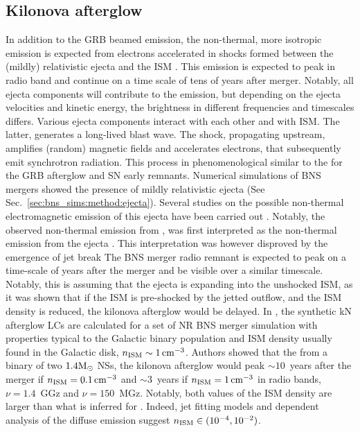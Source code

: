 \subsection{Kilonova afterglow}

In addition to the \ac{GRB} beamed emission, the non-thermal, more isotropic 
emission is expected from electrons accelerated in shocks formed between the 
(mildly) relativistic ejecta and the \ac{ISM} \citep{Nakar:2011cw}. This emission 
is expected to peak in radio band and continue on a time scale of tens of years 
after merger. Notably, all ejecta components will contribute to the emission, 
but depending on the ejecta velocities and kinetic energy, 
the brightness in different frequencies and timescales differs. 
%
Various ejecta components interact with each other and with \ac{ISM}. The latter, 
generates a long-lived blast wave. The shock, propagating upstream, amplifies 
(random) magnetic fields and accelerates electrons, that subsequently emit 
synchrotron radiation. This process in phenomenological similar to the for the 
\ac{GRB} afterglow and \ac{SN} early remnants. 
%
Numerical simulations of \ac{BNS} mergers showed the presence of mildly relativistic 
ejecta (See Sec.~\ref{sec:bns_sims:method:ejecta}). 
Several studies on the possible non-thermal electromagnetic emission of this ejecta 
have been carried out 
\citep[\eg][]{Piran:2012wd,Hotokezaka:2015eja,Hotokezaka:2018gmo,Radice:2018pdn}. 
Notably, the observed non-thermal emission from \GW{}, was first interpreted 
as the non-thermal emission from the ejecta \citep{Mooley:2017enz}.
This interpretation was however disproved by the emergence of jet break
%
The \ac{BNS} merger radio remnant is expected to peak on a time-scale 
of years after the merger and be visible over a similar timescale. Notably, this is 
assuming that the ejecta is expanding into the unshocked \ac{ISM}, as it was shown 
that if the \ac{ISM} is pre-shocked by the jetted outflow, and the \ac{ISM} density is 
reduced, the kilonova afterglow would be delayed. 
%
In \citet{Piran:2012wd}, the synthetic \ac{kN} afterglow \acp{LC} are calculated 
for a set of \ac{NR} \ac{BNS} merger simulation with properties typical to the 
Galactic binary population and \ac{ISM} density usually found in the Galactic disk, 
$n_{\text{ISM}}\sim1\,\text{cm}^{-3}$. Authors showed that the from a binary of two $1.4{\text{M}_{\odot}}$ \acp{NS}, 
the kilonova afterglow would peak $\sim10$~years after the merger if $n_{\text{ISM}} = 0.1\,\text{cm}^{-3}$ 
and $\sim3$~years if $n_{\text{ISM}} = 1\,\text{cm}^{-3}$ in radio bands, $\nu=1.4$~GGz and $\nu=150$~MGz. 
Notably, both values of the \ac{ISM} density are larger than what is inferred for \GW{}. 
Indeed, jet fitting models and dependent analysis of the diffuse emission suggest 
$n_{\text{ISM}}\in(10^{-4},10^{-2})$\gcm \citep{Hajela:2019mjy}.

